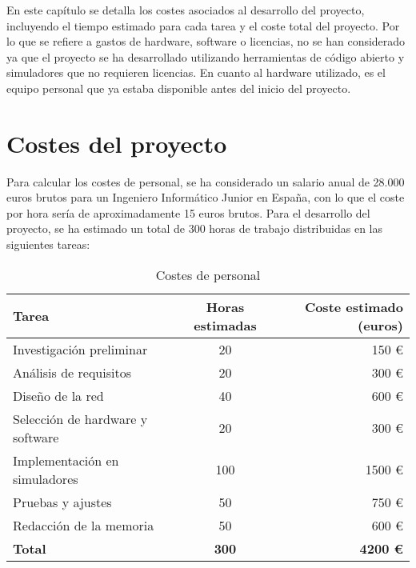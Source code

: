 En este capítulo se detalla los costes asociados al desarrollo del proyecto, incluyendo el tiempo estimado para cada tarea y el coste total del proyecto. Por lo que se refiere a gastos de hardware, software o licencias, no se han considerado ya que el proyecto se ha desarrollado utilizando herramientas de código abierto y simuladores que no requieren licencias. En cuanto al hardware utilizado, es el equipo personal que ya estaba disponible antes del inicio del proyecto.

\section{Costes del proyecto}
Para calcular los costes de personal, se ha considerado un salario anual de 28.000 euros brutos para un Ingeniero Informático Junior en España, con lo que el coste por hora sería de aproximadamente 15 euros brutos. Para el desarrollo del proyecto, se ha estimado un total de 300 horas de trabajo distribuidas en las siguientes tareas:
\begin{table}[H]
	\centering
	\small
	\begin{tabular}{|l|c|r|}
		\hline
		\textbf{Tarea}                   & \textbf{Horas estimadas} & \textbf{Coste estimado (euros)} \\
		\hline
		Investigación preliminar         & 20                       & 150 €                           \\ \hline
		Análisis de requisitos           & 20                       & 300 €                           \\ \hline
		Diseño de la red                 & 40                       & 600 €                           \\ \hline
		Selección de hardware y software & 20                       & 300 €                           \\ \hline
		Implementación en simuladores    & 100                      & 1500 €                          \\ \hline
		Pruebas y ajustes                & 50                       & 750 €                           \\ \hline
		Redacción de la memoria          & 50                       & 600 €                           \\ \hline
		\textbf{Total}                   & \textbf{300}             & \textbf{4200 €}                 \\
		\hline
	\end{tabular}
	\caption{Costes de personal}
	\label{tab:costes_proyecto}
\end{table}
